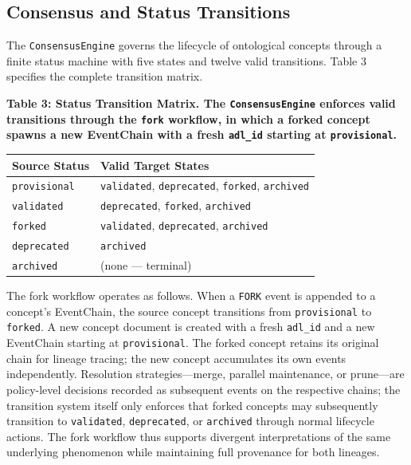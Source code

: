 \subsection{Consensus and Status Transitions}\label{consensus-and-status-transitions}

The \texttt{ConsensusEngine} governs the lifecycle of ontological concepts through a finite status machine with five states and twelve valid transitions. Table 3 specifies the complete transition matrix.

\textbf{Table 3: Status Transition Matrix. The \texttt{ConsensusEngine} enforces valid transitions through the \texttt{fork} workflow, in which a forked concept spawns a new EventChain with a fresh \texttt{adl\_id} starting at \texttt{provisional}.}

\begin{longtable}[]{@{}ll@{}}
\toprule
Source Status & Valid Target States \\
\midrule
\endhead
\bottomrule
\endlastfoot
\texttt{provisional} & \texttt{validated}, \texttt{deprecated}, \texttt{forked}, \texttt{archived} \\
\texttt{validated} & \texttt{deprecated}, \texttt{forked}, \texttt{archived} \\
\texttt{forked} & \texttt{validated}, \texttt{deprecated}, \texttt{archived} \\
\texttt{deprecated} & \texttt{archived} \\
\texttt{archived} & (none --- terminal) \\
\end{longtable}

The fork workflow operates as follows. When a \texttt{FORK} event is appended to a concept's EventChain, the source concept transitions from \texttt{provisional} to \texttt{forked}. A new concept document is created with a fresh \texttt{adl\_id} and a new EventChain starting at \texttt{provisional}. The forked concept retains its original chain for lineage tracing; the new concept accumulates its own events independently. Resolution strategies---merge, parallel maintenance, or prune---are policy-level decisions recorded as subsequent events on the respective chains; the transition system itself only enforces that forked concepts may subsequently transition to \texttt{validated}, \texttt{deprecated}, or \texttt{archived} through normal lifecycle actions. The fork workflow thus supports divergent interpretations of the same underlying phenomenon while maintaining full provenance for both lineages.

